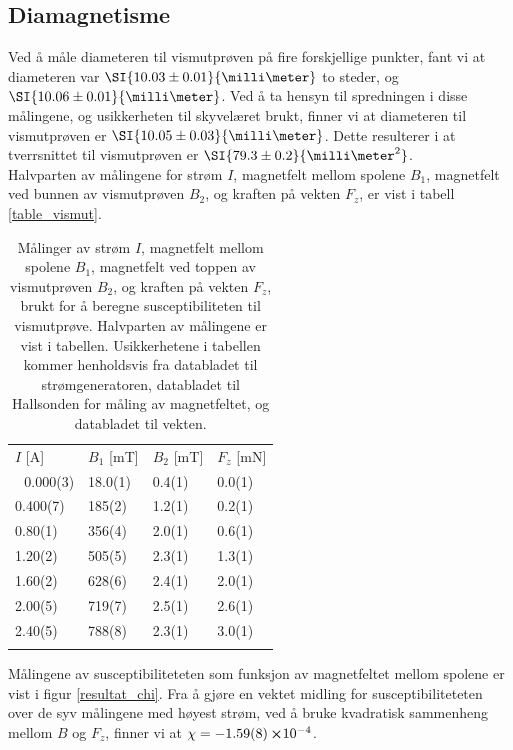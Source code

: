 \documentclass[%
 reprint,
nofootinbib,
aps,
]{revtex4-1}
\begin{document}
\subsection{Diamagnetisme}
Ved å måle diameteren til vismutprøven på fire forskjellige punkter, fant vi at diameteren var $\SI{10.03\pm0.01}{\milli\meter}$ to steder, og $\SI{10.06\pm0.01}{\milli\meter}$. Ved å ta hensyn til spredningen i disse målingene, og usikkerheten til skyvelæret brukt, finner vi at diameteren til vismutprøven er $\SI{10.05\pm0.03}{\milli\meter}$. Dette resulterer i at tverrsnittet til vismutprøven er $\SI{79.3\pm0.2}{\milli\meter^2}$.\\
Halvparten av målingene for strøm $I$, magnetfelt mellom spolene $B_1$, magnetfelt ved bunnen av vismutprøven $B_2$, og kraften på vekten $F_z$, er vist i tabell \vref{table_vismut}.
\begin{table}
  \centering
  \caption{Målinger av strøm $I$, magnetfelt mellom spolene $B_1$, magnetfelt ved toppen av vismutprøven $B_2$, og kraften på vekten $F_z$, brukt for å beregne susceptibiliteten til vismutprøve. Halvparten av målingene er vist i tabellen. Usikkerhetene i tabellen kommer henholdsvis fra databladet til strømgeneratoren, databladet til Hallsonden for måling av magnetfeltet, og databladet til vekten.}
  \label{table_vismut}
    \begin{tabular}{@{}llll@{}}\botrule
    $I$ {[}A{]} & $B_1$ {[}mT{]} & $B_2$ {[}mT{]} & $F_z$ {[}mN{]} \\ \colrule 
    0.000(3)    & 18.0(1)        & 0.4(1)         & 0.0(1)      \\
    0.400(7)    & 185(2)         & 1.2(1)         & 0.2(1)      \\
    0.80(1)     & 356(4)         & 2.0(1)         & 0.6(1)      \\
    1.20(2)     & 505(5)         & 2.3(1)         & 1.3(1)        \\
    1.60(2)     & 628(6)         & 2.4(1)         & 2.0(1)        \\
    2.00(5)     & 719(7)         & 2.5(1)         & 2.6(1)        \\
    2.40(5)     & 788(8)         & 2.3(1)         & 3.0(1)        \\\botrule
    \end{tabular}
\end{table}
Målingene av susceptibiliteteten som funksjon av magnetfeltet mellom spolene er vist i figur \vref{resultat_chi}. Fra å gjøre en vektet midling for susceptibiliteteten over de syv målingene med høyest strøm, ved å bruke kvadratisk sammenheng mellom $B$ og $F_z$, finner vi at $\chi = -\SI{1.59\pm0.08}\cross 10^{-4}$.
\end{document}
